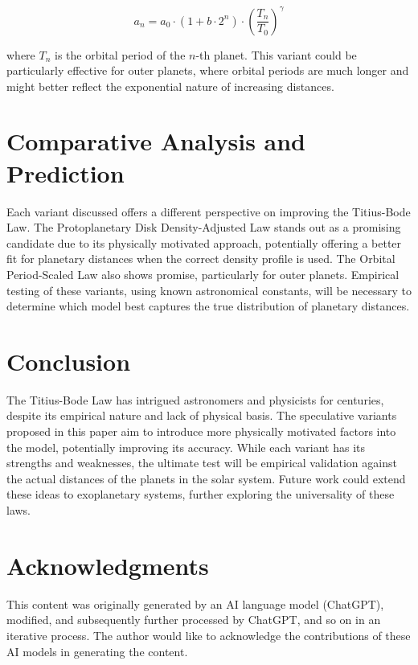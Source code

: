 \documentclass[12pt]{article}
\begin{document}
\begin{equation}
a_n = a_0 \cdot (1 + b \cdot 2^n) \cdot \left(\frac{T_n}{T_0}\right)^\gamma
\end{equation}

where \(T_n\) is the orbital period of the \(n\)-th planet. This variant could be particularly effective for outer planets, where orbital periods are much longer and might better reflect the exponential nature of increasing distances.

\section{Comparative Analysis and Prediction}

Each variant discussed offers a different perspective on improving the Titius-Bode Law. The Protoplanetary Disk Density-Adjusted Law stands out as a promising candidate due to its physically motivated approach, potentially offering a better fit for planetary distances when the correct density profile is used. The Orbital Period-Scaled Law also shows promise, particularly for outer planets. Empirical testing of these variants, using known astronomical constants, will be necessary to determine which model best captures the true distribution of planetary distances.

\section{Conclusion}

The Titius-Bode Law has intrigued astronomers and physicists for centuries, despite its empirical nature and lack of physical basis. The speculative variants proposed in this paper aim to introduce more physically motivated factors into the model, potentially improving its accuracy. While each variant has its strengths and weaknesses, the ultimate test will be empirical validation against the actual distances of the planets in the solar system. Future work could extend these ideas to exoplanetary systems, further exploring the universality of these laws.

\section{Acknowledgments}
This content was originally generated by an AI language model (ChatGPT), modified, and subsequently further processed by ChatGPT, and so on in an iterative process. The author would like to acknowledge the contributions of these AI models in generating the content.
\end{document}
